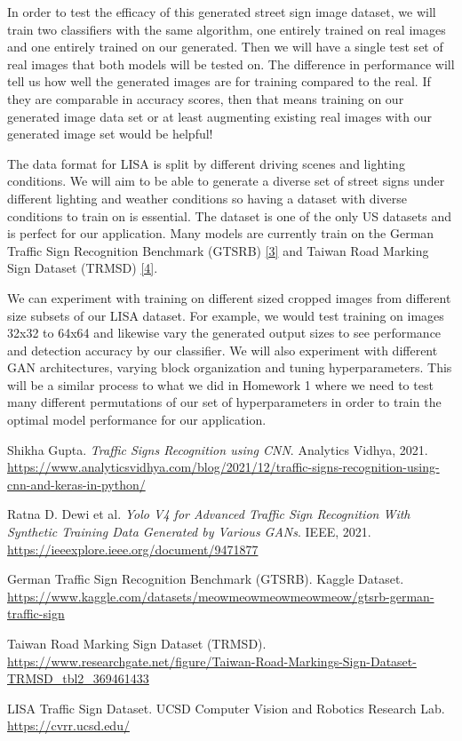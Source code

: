 \documentclass{article}
\begin{document}
\qquad In order to test the efficacy of this generated street sign image dataset, we will train two classifiers with the same algorithm, one entirely trained on real images and one entirely trained on our generated. Then we will have a single test set of real images that both models will be tested on. The difference in performance will tell us how well the generated images are for training compared to the real. If they are comparable in accuracy scores, then that means training on our generated image data set or at least augmenting existing real images with our generated image set would be helpful!

\qquad The data format for LISA is split by different driving scenes and lighting conditions. We will aim to be able to generate a diverse set of street signs under different lighting and weather conditions so having a dataset with diverse conditions to train on is essential. The dataset is one of the only US datasets and is perfect for our application. Many models are currently train on the German Traffic Sign Recognition Benchmark (GTSRB) \hyperref[GTSRB]{[3]} and Taiwan Road Marking Sign Dataset (TRMSD) \hyperref[TRMSD]{[4]}.

\qquad We can experiment with training on different sized cropped images from different size subsets of our LISA dataset. For example, we would test training on images 32x32 to 64x64 and likewise vary the generated output sizes to see performance and detection accuracy by our classifier.  We will also experiment with different GAN architectures, varying block organization and tuning hyperparameters. This will be a similar process to what we did in Homework 1 where we need to test many different permutations of our set of hyperparameters in order to train the optimal model performance for our application. 


\newpage

\begin{thebibliography}{9}

    Shikha Gupta.
    \textit{Traffic Signs Recognition using CNN}.
    Analytics Vidhya, 2021.
    \url{https://www.analyticsvidhya.com/blog/2021/12/traffic-signs-recognition-using-cnn-and-keras-in-python/}
    
    Ratna D. Dewi et al.
    \textit{Yolo V4 for Advanced Traffic Sign Recognition With Synthetic Training Data Generated by Various GANs}.
    IEEE, 2021.
    \url{https://ieeexplore.ieee.org/document/9471877}
    
    German Traffic Sign Recognition Benchmark (GTSRB).
    Kaggle Dataset.
    \url{https://www.kaggle.com/datasets/meowmeowmeowmeowmeow/gtsrb-german-traffic-sign}
    
    Taiwan Road Marking Sign Dataset (TRMSD).
    \url{https://www.researchgate.net/figure/Taiwan-Road-Markings-Sign-Dataset-TRMSD_tbl2_369461433}
    
    LISA Traffic Sign Dataset.
    UCSD Computer Vision and Robotics Research Lab.
    \url{https://cvrr.ucsd.edu/}
    
    \end{thebibliography}
    
\end{document}
